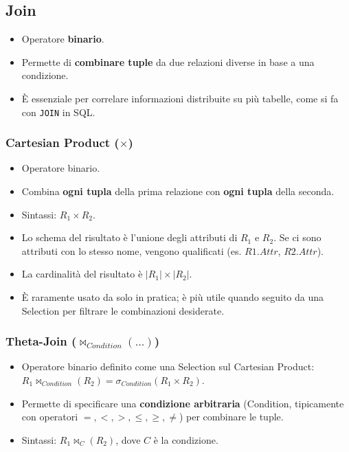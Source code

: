 \documentclass{article}
\newcommand{\selectop}[2]{\sigma_{#1}(#2)}
\newcommand{\thetajoin}[2]{\Join_{#1}(#2)}
\begin{document}
	\subsection{Join}
	\begin{itemize}
		\item Operatore \textbf{binario}.
		\item Permette di \textbf{combinare tuple} da due relazioni diverse in base a una condizione.
		\item È essenziale per correlare informazioni distribuite su più tabelle, come si fa con \texttt{JOIN} in SQL.
	\end{itemize}
	
	\subsubsection{Cartesian Product ($\times$)}
	\begin{itemize}
		\item Operatore binario.
		\item Combina \textbf{ogni tupla} della prima relazione con \textbf{ogni tupla} della seconda.
		\item Sintassi: $R_1 \times R_2$.
		\item Lo schema del risultato è l'unione degli attributi di $R_1$ e $R_2$. Se ci sono attributi con lo stesso nome, vengono qualificati (es. $R1.Attr$, $R2.Attr$).
		\item La cardinalità del risultato è $|R_1| \times |R_2|$.
		\item È raramente usato da solo in pratica; è più utile quando seguito da una Selection per filtrare le combinazioni desiderate.
	\end{itemize}
	
	\subsubsection{Theta-Join ($\thetajoin{Condition}{...}$)}
	\begin{itemize}
		\item Operatore binario definito come una Selection sul Cartesian Product: $R_1 \thetajoin{Condition}{R_2} = \selectop{Condition}{R_1 \times R_2}$.
		\item Permette di specificare una \textbf{condizione arbitraria} (Condition, tipicamente con operatori $=, <, >, \leq, \geq, \neq$) per combinare le tuple.
		\item Sintassi: $R_1 \thetajoin{C}{R_2}$, dove $C$ è la condizione.
	\end{itemize}
	
\end{document}
